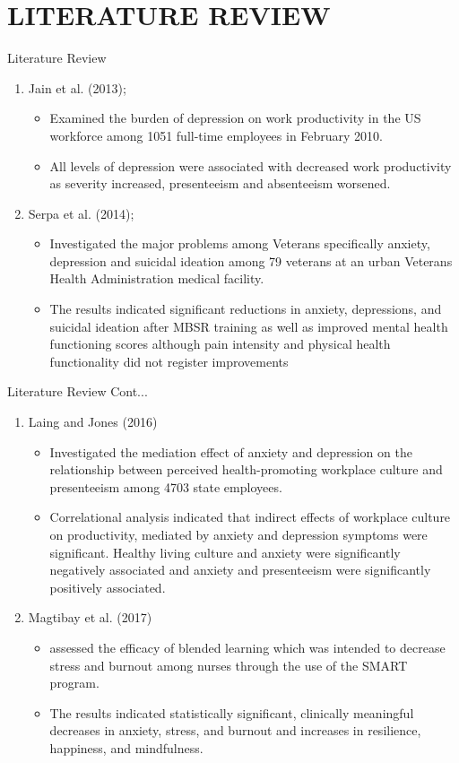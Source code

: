 \documentclass{beamer}
\newcounter{saveenumi}
\newcommand{\seti}{\setcounter{saveenumi}{\value{enumi}}}
\newcommand{\conti}{\setcounter{enumi}{\value{saveenumi}}}
\numberwithin{equation}{section}
\numberwithin{table}{section}
\begin{document}
\section{LITERATURE REVIEW}
\begin{frame}{Literature Review}
\begin{enumerate}
	\item Jain et al. (2013);
	\begin{itemize}
	\item  Examined the burden of depression on work productivity in the US workforce among 1051 full-time employees in February 2010.
	\item All levels of depression were associated with decreased work productivity as severity increased, presenteeism and absenteeism worsened.
	\end{itemize}

\item Serpa et al. (2014);

\begin{itemize}
\item Investigated the major problems among Veterans specifically anxiety, depression and suicidal ideation among 79 veterans at an urban Veterans Health Administration medical facility. 
\item The results indicated significant reductions in anxiety, depressions, and  suicidal ideation after MBSR training as well as improved mental health functioning scores although pain intensity and physical health functionality did not register improvements
\end{itemize}
\seti
	\end{enumerate}
\end{frame}
\begin{frame}{Literature Review Cont...}
\begin{enumerate}
	\conti
	\item Laing and Jones (2016)
\begin{itemize}
\item  Investigated the mediation effect of anxiety and depression on the relationship between perceived health-promoting workplace culture and presenteeism among 4703 state employees.
\item  Correlational analysis indicated that indirect effects of workplace culture on productivity, mediated by anxiety and depression symptoms were significant. Healthy living culture and anxiety were significantly negatively associated and anxiety and presenteeism were significantly positively associated.
\end{itemize}
\item Magtibay et al. (2017)
\begin{itemize}
	\item assessed the efficacy of blended learning which was intended to decrease stress and burnout among nurses through the use of the SMART program.
	\item  The results indicated statistically significant, clinically meaningful decreases in anxiety, stress, and burnout and increases in resilience, happiness, and mindfulness.
\end{itemize}
\seti
\end{enumerate}
\end{frame}
\end{document}
